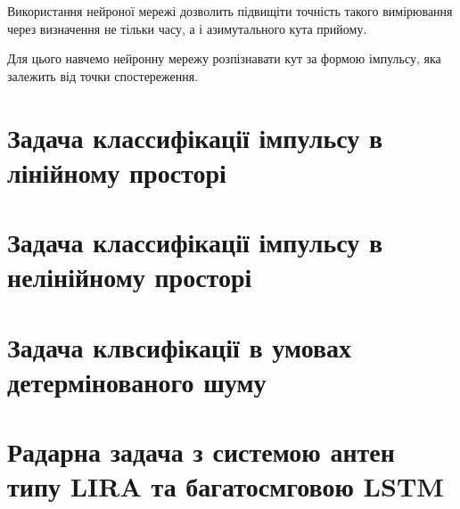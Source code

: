 Використання нейроної мережі дозволить підвищіти точність такого 
вимірювання через визначення не тільки часу, а і азимутального 
кута прийому.

Для цього навчемо нейронну мережу розпізнавати кут за формою 
імпульсу, яка залежить від точки спостереження.

\section{Задача классифікації імпульсу в лінійному просторі}

\section{Задача классифікації імпульсу в нелінійному просторі}

\section{Задача клвсифікації в умовах детермінованого шуму}

\section{Радарна задача з системою антен типу LIRA та багатосмговою LSTM}
